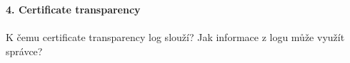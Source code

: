 \documentclass[a4paper,11pt]{article}
\begin{document}
\textbf{4. Certificate transparency} \\
~\\
K čemu certificate transparency log slouží? Jak informace z logu může využít správce?
~\\
~\\
~\\
\underline{\hspace{16cm}}

\thispagestyle{empty}
\end{document}
